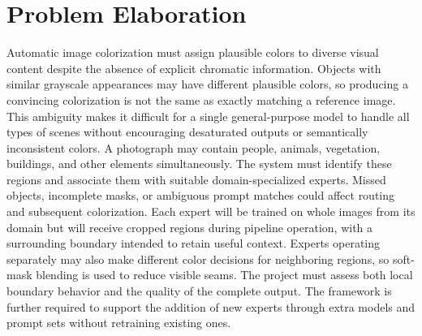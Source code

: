 \documentclass{FastFyp}
\begin{document}
\section{Problem Elaboration}
Automatic image colorization must assign plausible colors to diverse visual content despite the absence of explicit chromatic information. Objects with similar grayscale appearances may have different plausible colors, so producing a convincing colorization is not the same as exactly matching a reference image. This ambiguity makes it difficult for a single general-purpose model to handle all types of scenes without encouraging desaturated outputs or semantically inconsistent colors. A photograph may contain people, animals, vegetation, buildings, and other elements simultaneously. The system must identify these regions and associate them with suitable domain-specialized experts. Missed objects, incomplete masks, or ambiguous prompt matches could affect routing and subsequent colorization. Each expert will be trained on whole images from its domain but will receive cropped regions during pipeline operation, with a surrounding boundary intended to retain useful context. Experts operating separately may also make different color decisions for neighboring regions, so soft-mask blending is used to reduce visible seams. The project must assess both local boundary behavior and the quality of the complete output. The framework is further required to support the addition of new experts through extra models and prompt sets without retraining existing ones.
\end{document}
